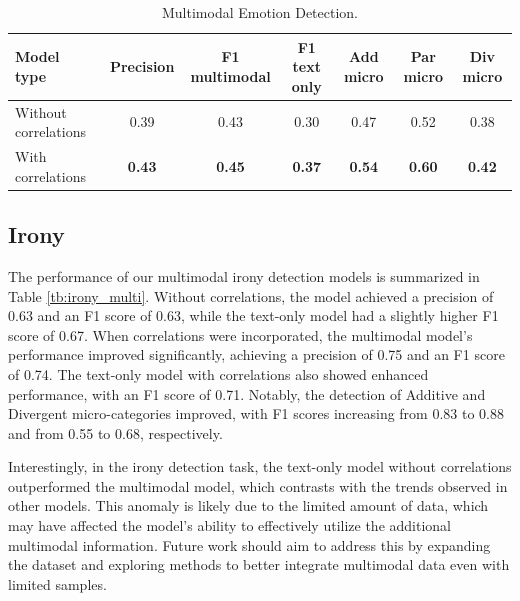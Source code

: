 \documentclass[letterpaper,journal]{IEEEtran}
\begin{document}
\begin{table}[htb!]
\begin{center}
{\footnotesize
\begin{tabular}{l|c|c|c|c|c|c}
\hline
\textbf{Model type} & \textbf{Precision} & \textbf{F1 multimodal} & \textbf{F1 text only} & \textbf{Add micro} & \textbf{Par micro} & \textbf{Div micro} \\
\hline
Without correlations & 0.39 & 0.43 & 0.30 & 0.47 & 0.52 & 0.38 \\
With correlations & \textbf{0.43} & \textbf{0.45} & \textbf{0.37} & \textbf{0.54} & \textbf{0.60} & \textbf{0.42} \\
\hline
\end{tabular}
}
\end{center}
\setlength{\belowcaptionskip}{-0.1cm}
\caption{Multimodal Emotion Detection.}
\label{tb:emotion_multi}
\end{table}

\subsection{Irony}

The performance of our multimodal irony detection models is summarized in Table \ref{tb:irony_multi}. Without correlations, the model achieved a precision of 0.63 and an F1 score of 0.63, while the text-only model had a slightly higher F1 score of 0.67. When correlations were incorporated, the multimodal model's performance improved significantly, achieving a precision of 0.75 and an F1 score of 0.74. The text-only model with correlations also showed enhanced performance, with an F1 score of 0.71. Notably, the detection of Additive and Divergent micro-categories improved, with F1 scores increasing from 0.83 to 0.88 and from 0.55 to 0.68, respectively.

Interestingly, in the irony detection task, the text-only model without correlations outperformed the multimodal model, which contrasts with the trends observed in other models. This anomaly is likely due to the limited amount of data, which may have affected the model's ability to effectively utilize the additional multimodal information. Future work should aim to address this by expanding the dataset and exploring methods to better integrate multimodal data even with limited samples.
\end{document}
